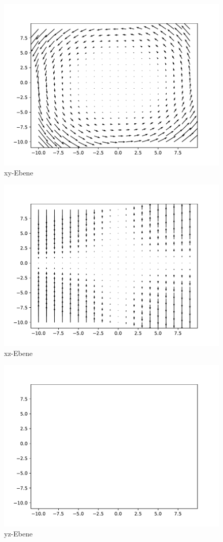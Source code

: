\documentclass{article}
\begin{document}
\begin{figure}
    \includegraphics{xy-Ebene.pdf}
    \caption{xy-Ebene}
\end{figure}
\begin{figure}
    \includegraphics{xz-Ebene.pdf}
    \caption{xz-Ebene}
\end{figure}
\begin{figure}
    \includegraphics{yz-Ebene.pdf}
    \caption{yz-Ebene}
\end{figure}
\end{document}
